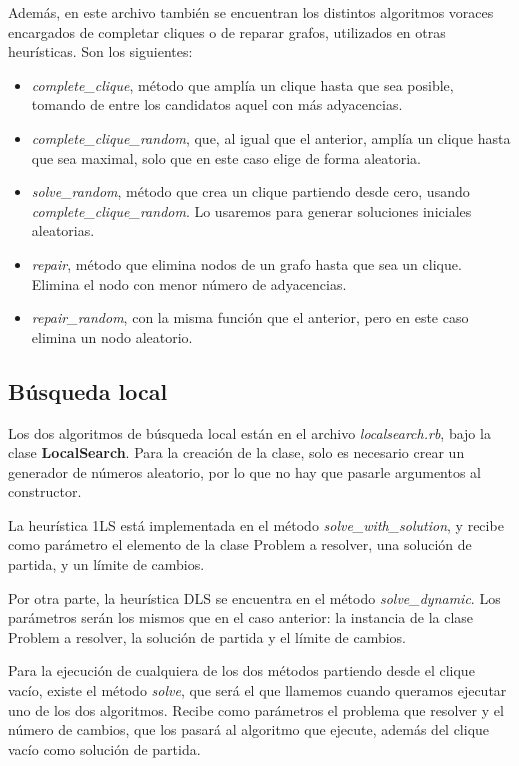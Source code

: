 Además, en este archivo también se encuentran los distintos algoritmos voraces
encargados de completar cliques o de reparar grafos, utilizados en otras heurísticas.
Son los siguientes:
\begin{itemize}
  \item \textit{complete_clique}, método que amplía un clique hasta que sea posible,
        tomando de entre los candidatos aquel con más adyacencias.
  \item \textit{complete_clique_random}, que, al igual que el anterior, amplía
        un clique hasta que sea maximal, solo que en este caso elige de forma aleatoria.
  \item \textit{solve_random}, método que crea un clique partiendo desde cero, usando
        \textit{complete_clique_random}. Lo usaremos para generar soluciones iniciales
        aleatorias.
  \item \textit{repair}, método que elimina nodos de un grafo hasta que sea un clique.
        Elimina el nodo con menor número de adyacencias.
  \item \textit{repair_random}, con la misma función que el anterior, pero en este
        caso elimina un nodo aleatorio.
\end{itemize}

\subsection{Búsqueda local}

Los dos algoritmos de búsqueda local están en el archivo \textit{localsearch.rb},
bajo la clase \textbf{LocalSearch}. Para la creación de la clase, solo es necesario
crear un generador de números aleatorio, por lo que no hay que pasarle argumentos
al constructor.

La heurística 1LS está implementada en el método \textit{solve_with_solution}, y
recibe como parámetro el elemento de la clase Problem a resolver, una solución
de partida, y un límite de cambios.

Por otra parte, la heurística DLS se encuentra en el método \textit{solve_dynamic}.
Los parámetros serán los mismos que en el caso anterior: la instancia de la clase
Problem a resolver, la solución de partida y el límite de cambios.

Para la ejecución de cualquiera de los dos métodos partiendo desde el clique
vacío, existe el método \textit{solve}, que será el que llamemos cuando queramos
ejecutar uno de los dos algoritmos. Recibe como parámetros el problema que resolver
y el número de cambios, que los pasará al algoritmo que ejecute, además del clique
vacío como solución de partida.

